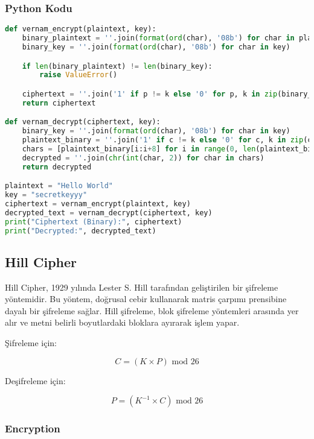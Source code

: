 \subsubsection{Python Kodu}

\begin{lstlisting}[language=Python]
def vernam_encrypt(plaintext, key):
    binary_plaintext = ''.join(format(ord(char), '08b') for char in plaintext)
    binary_key = ''.join(format(ord(char), '08b') for char in key)

    if len(binary_plaintext) != len(binary_key):
        raise ValueError()

    ciphertext = ''.join('1' if p != k else '0' for p, k in zip(binary_plaintext, binary_key))
    return ciphertext

def vernam_decrypt(ciphertext, key):
    binary_key = ''.join(format(ord(char), '08b') for char in key)
    plaintext_binary = ''.join('1' if c != k else '0' for c, k in zip(ciphertext, binary_key))
    chars = [plaintext_binary[i:i+8] for i in range(0, len(plaintext_binary), 8)]
    decrypted = ''.join(chr(int(char, 2)) for char in chars)
    return decrypted

plaintext = "Hello World"
key = "secretkeyyy"
ciphertext = vernam_encrypt(plaintext, key)
decrypted_text = vernam_decrypt(ciphertext, key)
print("Ciphertext (Binary):", ciphertext)
print("Decrypted:", decrypted_text)
\end{lstlisting}

\newpage

\subsection{Hill Cipher}

Hill Cipher, 1929 yılında Lester S. Hill tarafından geliştirilen bir şifreleme yöntemidir. Bu yöntem, doğrusal cebir kullanarak matris çarpımı prensibine dayalı bir şifreleme sağlar. Hill şifreleme, blok şifreleme yöntemleri arasında yer alır ve metni belirli boyutlardaki bloklara ayırarak işlem yapar.

Şifreleme için:

\[ C = (K \times P) \text{ mod } 26 \]

Deşifreleme için:

\[ P = (K^{-1} \times C) \text{ mod } 26 \]

\subsubsection{Encryption}

